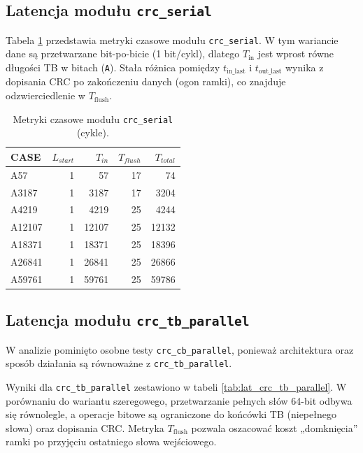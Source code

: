 \subsection{Latencja modułu \texttt{crc\_serial}}
\label{subsec:lat_crc_serial}

Tabela \ref{tab:lat_crc_serial} przedstawia metryki czasowe modułu \texttt{crc\_serial}.
W tym wariancie dane są przetwarzane bit-po-bicie (1 bit/cykl), dlatego $T_{\mathrm{in}}$ jest wprost równe długości TB w bitach
(\texttt{A}). Stała różnica pomiędzy $t_{\mathrm{in\_last}}$ i $t_{\mathrm{out\_last}}$ wynika z dopisania CRC po zakończeniu danych
(ogon ramki), co znajduje odzwierciedlenie w $T_{\mathrm{flush}}$.


\begin{table}[!ht]
\centering
\caption{Metryki czasowe modułu \texttt{crc\_serial} (cykle).}
\label{tab:lat_crc_serial}
\begin{tabular}{lrrrr}
\hline
CASE & $L_{start}$ & $T_{in}$ & $T_{flush}$ & $T_{total}$ \\
\hline
A57     & 1 & 57    & 17 & 74 \\
A3187   & 1 & 3187  & 17 & 3204 \\
A4219   & 1 & 4219  & 25 & 4244 \\
A12107  & 1 & 12107 & 25 & 12132 \\
A18371  & 1 & 18371 & 25 & 18396 \\
A26841  & 1 & 26841 & 25 & 26866 \\
A59761  & 1 & 59761 & 25 & 59786 \\
\hline
\end{tabular}
\end{table}

\subsection{Latencja modułu \texttt{crc\_tb\_parallel}}
\label{subsec:lat_crc_tb_parallel}

W analizie pominięto osobne testy \texttt{crc\_cb\_parallel}, ponieważ architektura oraz sposób działania są równoważne
z \texttt{crc\_tb\_parallel}.

Wyniki dla \texttt{crc\_tb\_parallel} zestawiono w tabeli \ref{tab:lat_crc_tb_parallel}.
W porównaniu do wariantu szeregowego, przetwarzanie pełnych słów 64-bit odbywa się równolegle,
a operacje bitowe są ograniczone do końcówki TB (niepełnego słowa) oraz dopisania CRC.
Metryka $T_{\mathrm{flush}}$ pozwala oszacować koszt „domknięcia” ramki po przyjęciu ostatniego słowa wejściowego.



